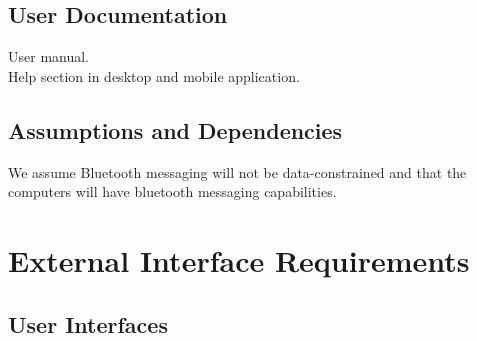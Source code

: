 \documentclass{article}
\begin{document}

\subsection{User Documentation}
User manual.\\
Help section in desktop and mobile application.
\subsection{Assumptions and Dependencies}
We assume Bluetooth messaging will not be data-constrained and that the computers will have bluetooth messaging capabilities.\\

\newpage
\section{External Interface Requirements}
\subsection{User Interfaces}
\end{document}
